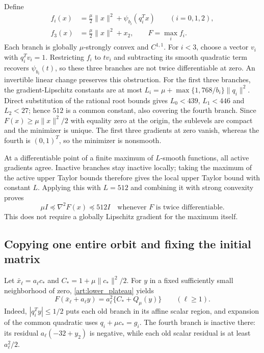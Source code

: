 Define
\begin{equation}\label{art:lower_objective}
 \begin{aligned}
 f_i(x)&=\tfrac\mu2\|x\|^2+\psi_{b_i}(q_i^Tx)\qquad(i=0,1,2),\\
 f_3(x)&=\tfrac\mu2\|x\|^2+x_2,\qquad F=\max_i f_i.
 \end{aligned}
\end{equation}
Each branch is globally $\mu$-strongly convex and $C^{1,1}$.
For $i<3$, choose a vector $v_i$ with $q_i^Tv_i=1$.
Restricting $f_i$ to $tv_i$ and subtracting its smooth quadratic term
recovers $\psi_{b_i}(t)$, so these three branches are not twice
differentiable at zero. An invertible linear change preserves this obstruction.
For the first three branches, the gradient-Lipschitz constants are at most
$L_i=\mu+\max\{1,768/b_i\}\|q_i\|^2$. Direct substitution of the
rational root bounds gives $L_0<439$, $L_1<446$ and $L_2<27$; hence
$512$ is a common constant, also covering the fourth branch.
Since $F(x)\ge\mu\|x\|^2/2$ with equality zero at the origin, the
sublevels are compact and the minimizer is unique. The first three
gradients at zero vanish, whereas the fourth is $(0,1)^T$, so the
minimizer is nonsmooth.

At a differentiable point of a finite maximum of $L$-smooth functions,
all active gradients agree. Inactive branches stay inactive locally;
taking the maximum of the active upper Taylor bounds therefore gives
the local upper Taylor bound with constant $L$. Applying this with
$L=512$ and combining it with strong convexity proves
\[
 \mu I\preceq\nabla^2F(x)\preceq512I
 \quad\text{whenever }F\text{ is twice differentiable}.
\]
This does not require a globally Lipschitz gradient for the maximum itself.

\subsection{Copying one entire orbit and fixing the initial matrix}
Let $\bar x_\ell=a_\ell c_*$ and $C_*=1+\mu\|c_*\|^2/2$.
For $y$ in a fixed sufficiently small neighborhood of zero,
\eqref{art:lower_plateau} yields
\begin{equation}\label{art:lower_local_model}
 F(\bar x_\ell+a_\ell y)=a_\ell^2\{C_*+Q_\mu(y)\}\qquad(\ell\ge1).
\end{equation}
Indeed, $|q_i^Ty|\le1/2$ puts each old branch in its affine scalar
region, and expansion of the common quadratic uses $q_i+\mu c_*=g_i$.
The fourth branch is inactive there: its residual $a_\ell(-32+y_2)$ is
negative, while each old scalar residual is at least $a_\ell^2/2$.

